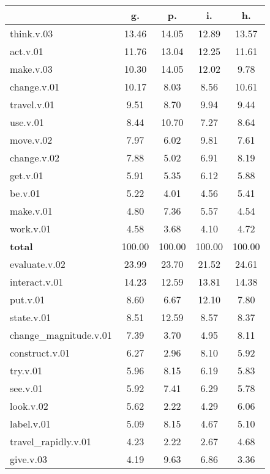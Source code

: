 \begin{table}[h!]
\begin{center}
\begin{tabular}{| l || c | c | c | c |}\hline
 & {\bf g.} & {\bf p.} & {\bf i.} & {\bf h.} \\\hline\hline
think.v.03 & 13.46  & 14.05  & 12.89  & 13.57 \\\hline
act.v.01 & 11.76  & 13.04  & 12.25  & 11.61 \\\hline
make.v.03 & 10.30  & 14.05  & 12.02  & 9.78 \\\hline
change.v.01 & 10.17  & 8.03  & 8.56  & 10.61 \\\hline
travel.v.01 & 9.51  & 8.70  & 9.94  & 9.44 \\\hline
use.v.01 & 8.44  & 10.70  & 7.27  & 8.64 \\\hline
move.v.02 & 7.97  & 6.02  & 9.81  & 7.61 \\\hline
change.v.02 & 7.88  & 5.02  & 6.91  & 8.19 \\\hline
get.v.01 & 5.91  & 5.35  & 6.12  & 5.88 \\\hline
be.v.01 & 5.22  & 4.01  & 4.56  & 5.41 \\\hline
make.v.01 & 4.80  & 7.36  & 5.57  & 4.54 \\\hline
work.v.01 & 4.58  & 3.68  & 4.10  & 4.72 \\\hline\hline
{{\bf total}} & 100.00  & 100.00  & 100.00  & 100.00 \\\hline\hline\hline
evaluate.v.02 & 23.99  & 23.70  & 21.52  & 24.61 \\\hline
interact.v.01 & 14.23  & 12.59  & 13.81  & 14.38 \\\hline
put.v.01 & 8.60  & 6.67  & 12.10  & 7.80 \\\hline
state.v.01 & 8.51  & 12.59  & 8.57  & 8.37 \\\hline
change\_magnitude.v.01 & 7.39  & 3.70  & 4.95  & 8.11 \\\hline
construct.v.01 & 6.27  & 2.96  & 8.10  & 5.92 \\\hline
try.v.01 & 5.96  & 8.15  & 6.19  & 5.83 \\\hline
see.v.01 & 5.92  & 7.41  & 6.29  & 5.78 \\\hline
look.v.02 & 5.62  & 2.22  & 4.29  & 6.06 \\\hline
label.v.01 & 5.09  & 8.15  & 4.67  & 5.10 \\\hline
travel\_rapidly.v.01 & 4.23  & 2.22  & 2.67  & 4.68 \\\hline
give.v.03 & 4.19  & 9.63  & 6.86  & 3.36 \\\hline\hline

\end{tabular}
\end{center}
\end{table}
